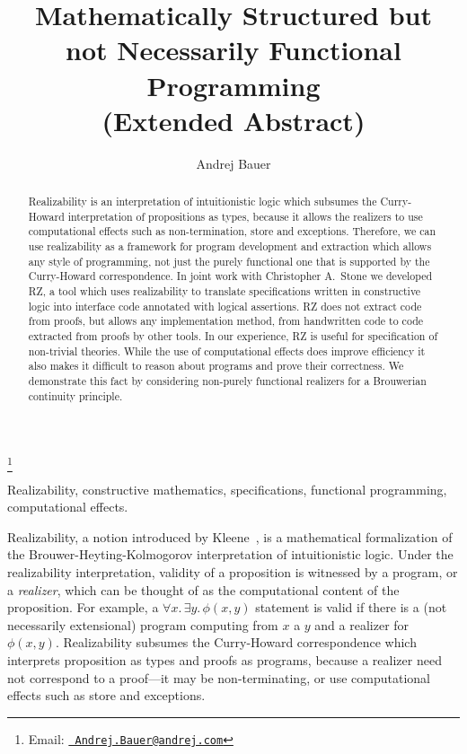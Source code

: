 \documentclass{entcs} \usepackage{prentcsmacro}
\begin{document}
\begin{frontmatter}
  \title{Mathematically Structured but\\
    not Necessarily Functional Programming\\(Extended Abstract)}
  \author{Andrej Bauer}
  \address{Faculty of Mathematics and Physics\\University of Ljubljana\\
    Ljubljana, Slovenia} \thanks[myemail]{Email:
    \href{mailto:Andrej.Bauer@andrej.com} {\texttt{\normalshape
        Andrej.Bauer@andrej.com}}}
\begin{abstract} 
  Realizability is an interpretation of intuitionistic logic which
  subsumes the Curry-Howard interpretation of propositions as types,
  because it allows the realizers to use computational effects such as
  non-termination, store and exceptions. Therefore, we can use
  realizability as a framework for program development and extraction
  which allows any style of programming, not just the purely
  functional one that is supported by the Curry-Howard correspondence.
  In joint work with Christopher A.~Stone we developed RZ, a tool
  which uses realizability to translate specifications written in
  constructive logic into interface code annotated with logical
  assertions. RZ does not extract code from proofs, but allows any
  implementation method, from handwritten code to code extracted from
  proofs by other tools. In our experience, RZ is useful for
  specification of non-trivial theories. While the use of
  computational effects does improve efficiency it also makes it
  difficult to reason about programs and prove their correctness. We
  demonstrate this fact by considering non-purely functional realizers
  for a Brouwerian continuity principle.
\end{abstract}
\begin{keyword}
  Realizability, constructive mathematics, specifications, functional
  programming, computational effects.
\end{keyword}
\end{frontmatter}

Realizability, a notion introduced by Kleene~\cite{kleene}, is a
mathematical formalization of the Brouwer-Heyting-Kolmogorov
interpretation of intuitionistic logic. Under the realizability
interpretation, validity of a proposition is witnessed by a program,
or a \emph{realizer}, which can be thought of as the computational
content of the proposition. For example, a $\forall x .\, \exists y
.\, \phi(x,y)$ statement is valid if there is a (not necessarily
extensional) program computing from $x$ a $y$ and a realizer for
$\phi(x,y)$. Realizability subsumes the Curry-Howard correspondence
which interprets proposition as types and proofs as programs, because
a realizer need not correspond to a proof---it may be non-terminating,
or use computational effects such as store and exceptions.
\end{document}
